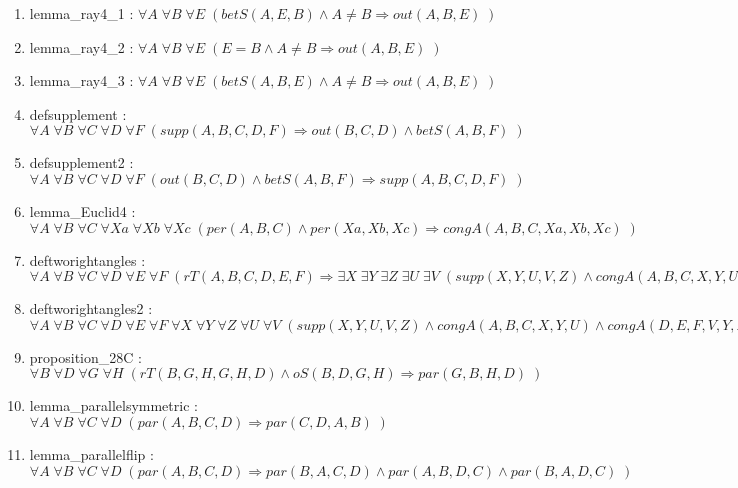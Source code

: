 \documentclass{article}
\begin{document}
\begin{enumerate}
\item lemma\_ray4\_1 : $\forall A \; \forall B \; \forall E \; ( betS(A, E, B)\wedge A \neq B \Rightarrow out(A, B, E)\;)$
\item lemma\_ray4\_2 : $\forall A \; \forall B \; \forall E \; ( E = B\wedge A \neq B \Rightarrow out(A, B, E)\;)$
\item lemma\_ray4\_3 : $\forall A \; \forall B \; \forall E \; ( betS(A, B, E)\wedge A \neq B \Rightarrow out(A, B, E)\;)$
\item defsupplement : $\forall A \; \forall B \; \forall C \; \forall D \; \forall F \; ( supp(A, B, C, D, F) \Rightarrow out(B, C, D)\wedge betS(A, B, F)\;)$
\item defsupplement2 : $\forall A \; \forall B \; \forall C \; \forall D \; \forall F \; ( out(B, C, D)\wedge betS(A, B, F) \Rightarrow supp(A, B, C, D, F)\;)$
\item lemma\_Euclid4 : $\forall A \; \forall B \; \forall C \; \forall Xa \; \forall Xb \; \forall Xc \; ( per(A, B, C)\wedge per(Xa, Xb, Xc) \Rightarrow congA(A, B, C, Xa, Xb, Xc)\;)$
\item deftworightangles : $\forall A \; \forall B \; \forall C \; \forall D \; \forall E \; \forall F \; ( rT(A, B, C, D, E, F) \Rightarrow \exists X \; \exists Y \; \exists Z \; \exists U \; \exists V \; (supp(X, Y, U, V, Z)\wedge congA(A, B, C, X, Y, U)\wedge congA(D, E, F, V, Y, Z))\;)$
\item deftworightangles2 : $\forall A \; \forall B \; \forall C \; \forall D \; \forall E \; \forall F \; \forall X \; \forall Y \; \forall Z \; \forall U \; \forall V \; ( supp(X, Y, U, V, Z)\wedge congA(A, B, C, X, Y, U)\wedge congA(D, E, F, V, Y, Z) \Rightarrow rT(A, B, C, D, E, F)\;)$
\item proposition\_28C : $\forall B \; \forall D \; \forall G \; \forall H \; ( rT(B, G, H, G, H, D)\wedge oS(B, D, G, H) \Rightarrow par(G, B, H, D)\;)$
\item lemma\_parallelsymmetric : $\forall A \; \forall B \; \forall C \; \forall D \; ( par(A, B, C, D) \Rightarrow par(C, D, A, B)\;)$
\item lemma\_parallelflip : $\forall A \; \forall B \; \forall C \; \forall D \; ( par(A, B, C, D) \Rightarrow par(B, A, C, D)\wedge par(A, B, D, C)\wedge par(B, A, D, C)\;)$
\end{enumerate}

\hrulefill
\end{document}
